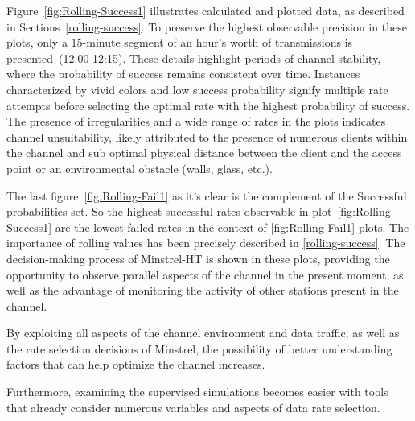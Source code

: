 Figure~\ref{fig:Rolling-Success1} illustrates calculated and plotted data, as described in Sections~\ref{rolling-success}. To preserve the highest observable precision in these plots, only a 15-minute segment of an hour's worth of transmissions is presented~(12:00-12:15). These details highlight periods of channel stability, where the probability of success remains consistent over time. Instances characterized by vivid colors and low success probability signify multiple rate attempts before selecting the optimal rate with the highest probability of success. The presence of irregularities and a wide range of rates in the plots indicates channel unsuitability, likely attributed to the presence of numerous clients within the channel and sub optimal physical distance between the client and the access point or an environmental obstacle (walls, glass, etc.).

The last figure~\ref{fig:Rolling-Fail1} as it's clear is the complement of the  Successful probabilities set. So the highest successful rates observable in plot~\ref{fig:Rolling-Success1} are the lowest failed rates in the context of \ref{fig:Rolling-Fail1} plots. The importance of rolling values has been precisely described in \ref{rolling-success}. The decision-making process of Minstrel-HT is shown in these plots, providing the opportunity to observe parallel aspects of the channel in the present moment, as well as the advantage of monitoring the activity of other stations present in the channel.

By exploiting all aspects of the channel environment and data traffic, as well as the rate selection decisions of Minstrel, the possibility of better understanding factors that can help optimize the channel increases.

Furthermore, examining the supervised simulations becomes easier with tools that already consider numerous variables and aspects of data rate selection.

